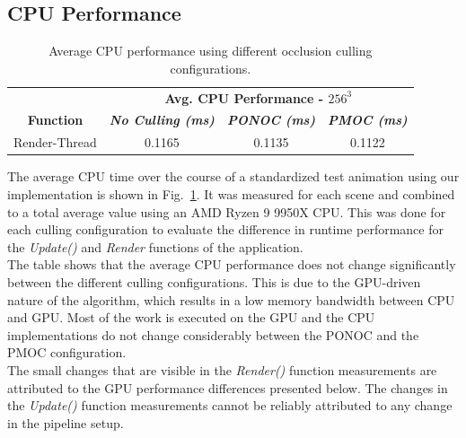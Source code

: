 \documentclass[conference]{IEEEtran}
\begin{document}
\subsection{CPU Performance} \label{subsec-cou-performance}

\begin{table}[htbp]
    \caption{Average \ac{CPU} performance using different occlusion culling configurations.}
    \begin{center}
        \begin{tabular}{|c|c|c|c|}
            \hline
            \textbf{}&\multicolumn{3}{|c|}{\textbf{Avg. \ac{CPU} Performance - $256^3$}} \\
            \cline{2-4} 
            \textbf{Function} & \textbf{\textit{No Culling (ms)}} & \textbf{\textit{\ac{PONOC} (ms)}} & \textbf{\textit{\ac{PMOC} (ms)}}  \\
            \hline
            Render-Thread      &  0.1165   & 0.1135    &  0.1122   \\
            \hline
        \end{tabular}
    \label{tab:cpu-performance}
    \end{center}
\end{table}

\noindent
The average \ac{CPU} time over the course of a standardized test animation using our implementation is 
shown in Fig.~\ref{tab:cpu-performance}. It was measured for each scene and combined to a total 
average value using an AMD Ryzen 9 9950X \ac{CPU}. This was done for each culling configuration to 
evaluate the difference in runtime performance for the \emph{Update()} and \emph{Render} functions 
of the application. \\

\noindent
The table shows that the average \ac{CPU} performance does not change significantly between the different 
culling configurations. This is due to the \ac{GPU}-driven nature of the algorithm, which results in a 
low memory bandwidth between \ac{CPU} and \ac{GPU}. Most of the work is executed on the \ac{GPU} and the \ac{CPU} 
implementations do not change considerably between the \ac{PONOC} and the 
\ac{PMOC} configuration. \\

\noindent
The small changes that are visible in the \emph{Render()} function measurements are attributed to 
the \ac{GPU} performance differences presented below. The changes in the \emph{Update()} function 
measurements cannot be reliably attributed to any change in the pipeline setup.
\end{document}
